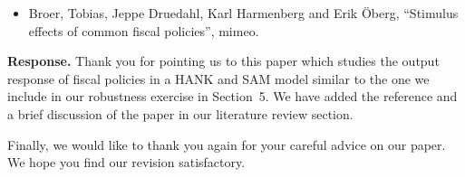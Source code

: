 \documentclass[12pt,letterpaper,english]{article}
\begin{document}
	\begin{itemize}
		\item Broer, Tobias, Jeppe Druedahl, Karl Harmenberg and Erik \"Oberg, ``Stimulus effects of common fiscal policies'', mimeo. 
	\end{itemize}

	\noindent \textbf{Response.} Thank you for pointing us to this paper which studies the output response of fiscal policies in a HANK and SAM model similar to the one we include in our robustness exercise in Section~5. We have added the reference and a brief discussion of the paper in our literature review section. 

\bigskip

\noindent Finally, we would like to thank you again for your careful advice on our paper. We hope you find our revision satisfactory.



\end{document}
